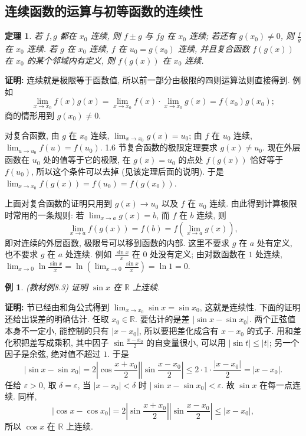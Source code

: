 \documentclass[UTF8,openany]{ctexbook}
\theoremstyle{chinesetextbook}
\newtheorem{example}{例}[section]
\newtheorem{theorem}{定理}[section]
\newenvironment{cnproof}{\par\indent\textbf{证明:} \ignorespaces}{\par}
\begin{document}
\subsection{连续函数的运算与初等函数的连续性}
\begin{theorem}
若 $f,g$ 都在 $x_0$ 连续, 则 $f\pm g$ 与 $fg$ 在 $x_0$ 连续; 若还有 $g(x_0)\ne0$, 则 $\displaystyle\frac fg$ 在 $x_0$ 连续. 若 $g$ 在 $x_0$ 连续, $f$ 在 $u_0=g(x_0)$ 连续, 并且复合函数 $f(g(x))$ 在 $x_0$ 的某个邻域内有定义, 则 $f(g(x))$ 在 $x_0$ 连续.
\end{theorem}
\begin{cnproof}
连续就是极限等于函数值, 所以前一部分由极限的四则运算法则直接得到. 例如
\[
\lim_{x\to x_0}f(x)g(x)=\lim_{x\to x_0}f(x)\cdot\lim_{x\to x_0}g(x)=f(x_0)g(x_0);
\]
商的情形用到 $g(x_0)\ne0$.

对复合函数, 由 $g$ 在 $x_0$ 连续, $\displaystyle\lim_{x\to x_0}g(x)=u_0$; 由 $f$ 在 $u_0$ 连续, $\displaystyle\lim_{u\to u_0}f(u)=f(u_0)$. 1.6 节复合函数的极限定理要求 $g(x)\ne u_0$. 现在外层函数在 $u_0$ 处的值等于它的极限, 在 $g(x)=u_0$ 的点处 $f(g(x))$ 恰好等于 $f(u_0)$, 所以这个条件可以去掉 (见该定理后面的说明). 于是 $\displaystyle\lim_{x\to x_0}f(g(x))=f(u_0)=f(g(x_0))$.
\end{cnproof}
上面对复合函数的证明只用到 $g(x)\to u_0$ 以及 $f$ 在 $u_0$ 连续. 由此得到计算极限时常用的一条规则: 若 $\displaystyle\lim_{x\to a}g(x)=b$, 而 $f$ 在 $b$ 连续, 则
\[
\lim_{x\to a}f(g(x))=f(b)=f\left(\lim_{x\to a}g(x)\right),
\]
即对连续的外层函数, 极限号可以移到函数的内部. 这里不要求 $g$ 在 $a$ 处有定义, 也不要求 $g$ 在 $a$ 处连续. 例如 $\displaystyle\frac{\sin x}x$ 在 $0$ 处没有定义; 由对数函数在 $1$ 处连续, $\displaystyle\lim_{x\to0}\ln\frac{\sin x}x=\ln\left(\lim_{x\to0}\frac{\sin x}x\right)=\ln1=0$.
\begin{example}\label{ex:8-3}
\textnormal{(教材例8.3)} 证明 $\sin x$ 在 $\mathbb R$ 上连续.
\end{example}
\begin{cnproof}
1.6 节已经由和角公式得到 $\displaystyle\lim_{x\to x_0}\sin x=\sin x_0$, 这就是连续性. 下面的证明还给出误差的明确估计. 任取 $x_0\in\mathbb R$. 要估计的是差 $|\sin x-\sin x_0|$. 两个正弦值本身不一定小, 能控制的只有 $|x-x_0|$, 所以要把差化成含有 $x-x_0$ 的式子. 用和差化积把差写成乘积, 其中因子 $\displaystyle\sin\frac{x-x_0}2$ 的自变量很小, 可以用 $|\sin t|\le|t|$; 另一个因子是余弦, 绝对值不超过 $1$. 于是
\[
|\sin x-\sin x_0|=2\left|\cos\frac{x+x_0}2\right|\left|\sin\frac{x-x_0}2\right|\le2\cdot1\cdot\frac{|x-x_0|}2=|x-x_0|.
\]
任给 $\varepsilon>0$, 取 $\delta=\varepsilon$, 当 $|x-x_0|<\delta$ 时 $|\sin x-\sin x_0|<\varepsilon$. 故 $\sin x$ 在每一点连续. 同样,
\[
|\cos x-\cos x_0|=2\left|\sin\frac{x+x_0}2\right|\left|\sin\frac{x-x_0}2\right|\le|x-x_0|,
\]
所以 $\cos x$ 在 $\mathbb R$ 上连续.
\end{cnproof}
\end{document}
